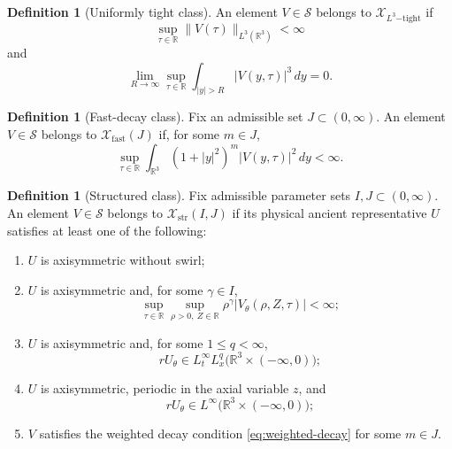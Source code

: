 \documentclass[11pt]{amsart}
\theoremstyle{plain}
\theoremstyle{definition}
\newtheorem{definition}[theorem]{Definition}
\theoremstyle{remark}
\numberwithin{equation}{section}
\begin{document}
\begin{definition}[Uniformly tight class]\label{def:tight-branch}
An element \(V\in\mathcal S\) belongs to
\(\mathcal X_{L^3\mathrm{-tight}}\) if
\begin{equation}\label{eq:L3-bound}
   \sup_{\tau\in\mathbb R}\|V(\tau)\|_{L^3(\mathbb R^3)}<\infty
\end{equation}
and
\begin{equation}\label{eq:L3-tightness}
   \lim_{R\to\infty}
   \sup_{\tau\in\mathbb R}\int_{|y|>R}|V(y,\tau)|^3\,dy=0 .
\end{equation}
\end{definition}

\begin{definition}[Fast-decay class]\label{def:fast-branch}
Fix an admissible set \(J\subset(0,\infty)\).  An element \(V\in\mathcal S\)
belongs to \(\mathcal X_{\mathrm{fast}}(J)\) if, for some \(m\in J\),
\begin{equation}\label{eq:weighted-decay}
   \sup_{\tau\in\mathbb R}
   \int_{\mathbb R^3}(1+|y|^2)^m |V(y,\tau)|^2\,dy<\infty .
\end{equation}
\end{definition}

\begin{definition}[Structured class]\label{def:structured-branch}
Fix admissible parameter sets \(I,J\subset(0,\infty)\).  An element
\(V\in\mathcal S\) belongs to \(\mathcal X_{\mathrm{str}}(I,J)\) if its
physical ancient representative \(U\) satisfies at least one of the following:
\begin{enumerate}
\item \(U\) is axisymmetric without swirl;
\item \(U\) is axisymmetric and, for some \(\gamma\in I\),
\[
   \sup_{\tau\in\mathbb R}\sup_{\rho>0,\ Z\in\mathbb R}
   \rho^\gamma |V_\theta(\rho,Z,\tau)|<\infty;
\]
\item \(U\) is axisymmetric and, for some \(1\le q<\infty\),
\[
   rU_\theta\in L_t^\infty L_x^q
      \bigl(\mathbb R^3\times(-\infty,0)\bigr);
\]
\item \(U\) is axisymmetric, periodic in the axial variable \(z\), and
\[
   rU_\theta\in L^\infty\bigl(\mathbb R^3\times(-\infty,0)\bigr);
\]
\item \(V\) satisfies the weighted decay condition \eqref{eq:weighted-decay}
for some \(m\in J\).
\end{enumerate}
\end{definition}
\end{document}
